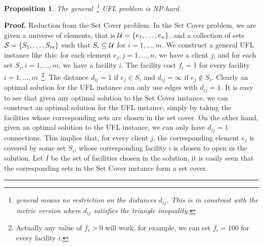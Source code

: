\documentclass[oneside,final]{ucr}
\newtheorem{proposition}[theorem]{Proposition}
\newenvironment{proof}[1][Proof]{\textbf{#1.} }{\ \rule{0.5em}{0.5em}}
\begin{document}
\begin{proposition}\label{prop:UFLNP}
  The general~\footnote{\emph{general} means no restriction
    on the distances $d_{ij}$. This is in constrast with the
    \emph{metric} version where $d_{ij}$ satisfies the
    triangle inequality.} UFL problem is NP-hard.
\end{proposition}
\begin{proof}
  Reduction from the Set Cover problem. In the Set Cover
  problem, we are given a universe of elements, that is
  $\calU = \{e_1, \ldots, e_n\}$, and a collection of sets
  $\calS = \{S_1, \ldots, S_m\}$ such that $S_i \subseteq
  \calU$ for $i=1,\ldots,m$. We construct a general UFL
  instance like this: for each element $e_j, j=1,\ldots,n$,
  we have a client $j$; and for each set $S_i,
  i=1,\ldots,m$, we have a facility $i$. The facility cost
  $f_i=1$ for every facility
  $i=1,\ldots,m$~\footnote{Actually any value of $f_i > 0$
    will work, for example, we can set $f_i=100$ for every
    facility $i$.}. The distance $d_{ij} = 1$ if $e_j \in
  S_i$ and $d_{ij} = \infty$ if $e_j \notin S_i$. Clearly an
  optimal solution for the UFL instance can only use edges
  with $d_{ij} = 1$. It is easy to see that given any
  optimal solution to the Set Cover instance, we can
  construct an optimal solution for the UFL instance, simply
  by taking the facilities whose corresponding sets are
  chosen in the set cover. On the other hand, given an
  optimal solution to the UFL instance, we can only have
  $d_{ij}=1$ connections. This implies that, for every
  client $j$, the corresponding element $e_j$ is covered by
  some set $S_i$, whose corresponding facility $i$ is chosen
  to open in the {\UFL} solution. Let $I$ be the set of
  facilities chosen in the {\UFL} solution, it is easily
  seen that the corresponding sets in the Set Cover instance
  form a set cover.
\end{proof}
\end{document}
